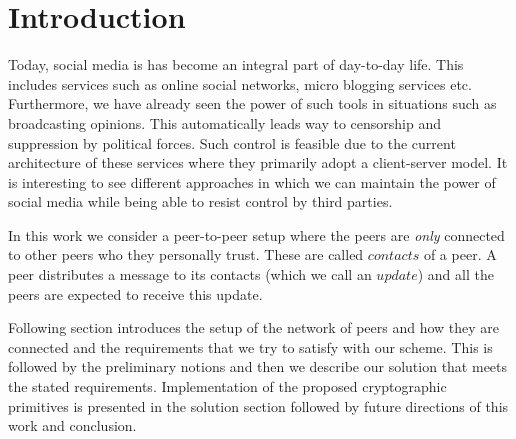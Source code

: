 \section{Introduction}

Today, social media is has become an integral part of day-to-day life. This includes services such as online social networks, micro blogging services etc. Furthermore, we have already seen the power of such tools in situations such as broadcasting opinions. This automatically leads way to censorship and suppression by political forces. Such control is feasible due to the current architecture of these services where they primarily adopt a client-server model. It is interesting to see different approaches in which we can maintain the power of social media while being able to resist control by third parties.

In this work we consider a peer-to-peer setup where the peers are \emph{only} connected to other peers who they personally trust. These are called $contacts$ of a peer. A peer distributes a message to its contacts (which we call an $update$) and all the peers are expected to receive this update. 

Following section introduces the setup of the network of peers and how they are connected and the requirements that we try to satisfy with our scheme. This is followed by the preliminary notions and then we describe our solution that meets the stated requirements. Implementation of the proposed cryptographic primitives is presented in the solution section followed by future directions of this work and conclusion.
